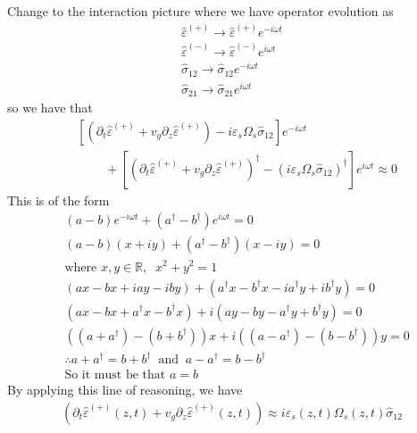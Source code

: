 \documentclass[aps,pra,showpacs,amsmath,amssymb,nofootinbib,longbibliography,superscriptaddress
]{revtex4-1}
\theoremstyle{definition}
\theoremstyle{remark}
\newcommand{\0}{\hat{0}}
\begin{document}
Change to the interaction picture where we have operator evolution as 
\begin{align}
\hat{\varepsilon}^{(+)} \rightarrow \hat{\varepsilon}^{(+)} e^{-i \omega t} \\
\hat{\varepsilon}^{(-)} \rightarrow \hat{\varepsilon}^{(-)} e^{i \omega t}\\
\hat{\sigma}_{12} \rightarrow \hat{\sigma}_{12} e^{-i \omega t}\\
\hat{\sigma}_{21} \rightarrow \hat{\sigma}_{21} e^{i \omega t}
\end{align}
so we have that
\begin{align}
    &\left[\left(\partial_t \hat{\varepsilon}^{(+)} + v_g \partial_z \hat{\varepsilon}^{(+)}\right) - i \varepsilon_s \Omega_{s} \hat{\sigma}_{12}\right] e^{-i \omega t} \nonumber \\
    &\;\;\;\;\;\;\;\;+ \left[\left(\partial_t \hat{\varepsilon}^{(+)} + v_g \partial_z \hat{\varepsilon}^{(+)}\right)^{\dagger} - \left(i \varepsilon_s \Omega_{s} \hat{\sigma}_{12}\right)^{\dagger}\right]e^{i \omega t} 
    \approx 0
\end{align}
This is of the form
\begin{align}
    &(a - b)e^{-i \omega t} + (a^{\dagger} - b^{\dagger})e^{i \omega t} = 0 \nonumber \\
    &(a - b)(x + iy) + (a^{\dagger} - b^{\dagger})(x - iy) = 0 \nonumber \\
    &\text{where } x,y \in \mathbb{R},\;\; x^2 + y^2 = 1 \nonumber \\
    &(ax - bx + iay - iby) + (a^{\dagger} x - b^{\dagger} x - i a^{\dagger} y + ib^{\dagger} y) = 0\nonumber \\
    &(ax - bx + a^{\dagger} x - b^{\dagger} x) + i(ay - by - a^{\dagger} y + b^{\dagger} y) = 0\nonumber \\
    &((a + a^{\dagger}) - (b + b^{\dagger}))x + i((a - a^{\dagger}) - (b - b^{\dagger}))y = 0 \nonumber \\
    &\therefore a + a^{\dagger} = b + b^{\dagger} \;\;\text{and}\;\; a - a^{\dagger} = b - b^{\dagger} \nonumber \\
    &\text{So it must be that } a = b
\end{align}
By applying this line of reasoning, we have
\begin{align}
    \left(\partial_t \hat{\varepsilon}^{(+)}(z,t) + v_g \partial_z \hat{\varepsilon}^{(+)}(z,t)\right)
    \approx
    i \varepsilon_s(z,t) \Omega_{s}(z,t) \hat{\sigma}_{12}
\end{align}
\end{document}

